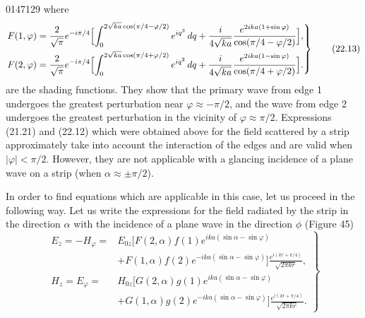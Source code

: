 \begin{scanpage}{0147}{129}
where
\[
\left.\begin{aligned}
F(1,\varphi)&=\frac2{\sqrt\pi}e^{-i\pi/4}\Bigl[\int_0^{2\sqrt{ka}\cos(\pi/4-\varphi/2)}e^{iq^2}\,dq+\frac{i}{4\sqrt{ka}}\frac{e^{2ika(1+\sin\varphi)}}{\cos(\pi/4-\varphi/2)}\Bigr],\\
F(2,\varphi)&=\frac2{\sqrt\pi}e^{-i\pi/4}\Bigl[\int_0^{2\sqrt{ka}\cos(\pi/4+\varphi/2)}e^{iq^2}\,dq+\frac{i}{4\sqrt{ka}}\frac{e^{2ika(1-\sin\varphi)}}{\cos(\pi/4+\varphi/2)}\Bigr].
\end{aligned}\right\}\tag{22.13}
\]
are the shading functions. They show that the primary wave from edge 1 undergoes the greatest perturbation near $\varphi\approx-\pi/2$, and the wave from edge 2 undergoes the greatest perturbation in the vicinity of $\varphi\approx\pi/2$.
Expressions (21.21) and (22.12) which were obtained above for the field scattered by a strip approximately take into account the interaction of the edges and are valid when $|\varphi|<\pi/2$. However, they are not applicable with a glancing incidence of a plane wave on a strip (when $\alpha\approx\pm\pi/2$).

In order to find equations which are applicable in this case, let us proceed in the following way. Let us write the expressions for the field radiated by the strip in the direction $\alpha$ with the incidence of a plane wave in the direction $\phi$ (Figure 45)
\[
\left.\begin{aligned}E_z=-H_\varphi={}&E_{0z}[F(2,\alpha)f(1)e^{ika(\sin\alpha-\sin\varphi)}\\&+F(1,\alpha)f(2)e^{-ika(\sin\alpha-\sin\varphi)}]\frac{e^{i(kr+\pi/4)}}{\sqrt{2\pi kr}},\\
H_z=E_\varphi={}&H_{0z}[G(2,\alpha)g(1)e^{ika(\sin\alpha-\sin\varphi)}\\&+G(1,\alpha)g(2)e^{-ika(\sin\alpha-\sin\varphi)}]\frac{e^{i(kr+\pi/4)}}{\sqrt{2\pi kr}}.
\end{aligned}\right\}\tag{23.01}
\]
\end{scanpage}
